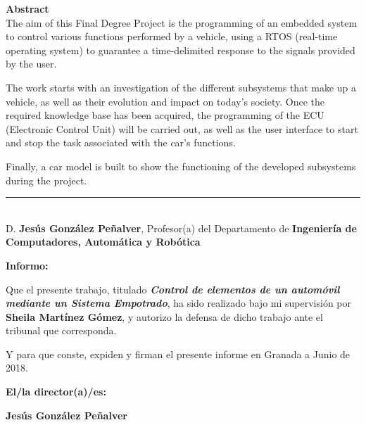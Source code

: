 \noindent\textbf{Abstract}\\

The aim of this Final Degree Project is the programming of an embedded system to control various functions performed by a vehicle, using a RTOS (real-time operating system) to guarantee a time-delimited response to the signals provided by the user.\newline

The work starts with an investigation of the different subsystems that make up a vehicle, as well as their evolution and impact on today's society. Once the required knowledge base has been acquired, the programming of the ECU (Electronic Control Unit) will be carried out, as well as the user interface to start and stop the task associated with the car's functions.\newline

Finally, a car model is built to show the functioning of the developed subsystems during the project.\newline

\cleardoublepage

\thispagestyle{empty}

\noindent\rule[-1ex]{\textwidth}{2pt}\\[4.5ex]

D. \textbf{Jesús González Peñalver}, Profesor(a) del Departamento de \textbf{Ingeniería de Computadores, Automática y Robótica}

\vspace{0.5cm}

\textbf{Informo:}

\vspace{0.5cm}

Que el presente trabajo, titulado \textit{\textbf{Control de elementos de un automóvil mediante un Sistema Empotrado}}, ha sido realizado bajo mi supervisión por \textbf{Sheila Martínez Gómez}, y autorizo la defensa de dicho trabajo ante el tribunal que corresponda.

\vspace{0.5cm}

Y para que conste, expiden y firman el presente informe en Granada a Junio de 2018.

\vspace{1cm}

\textbf{El/la director(a)/es: }

\vspace{5cm}

\noindent \textbf{Jesús González Peñalver}

